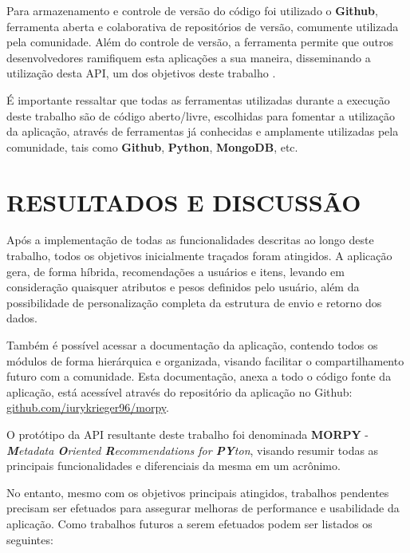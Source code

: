 \documentclass[12pt, openright, oneside, a4paper, brazil]{abntex2}
\begin{document}
Para armazenamento e controle de versão do código foi utilizado o \textbf{Github}, ferramenta aberta e colaborativa de repositórios de versão, comumente utilizada pela comunidade. Além do controle de versão, a ferramenta permite que outros desenvolvedores ramifiquem esta aplicações a sua maneira, disseminando a utilização desta API, um dos objetivos deste trabalho \cite{dabbish2012social}.

É importante ressaltar que todas as ferramentas utilizadas durante a execução deste trabalho são de código aberto/livre, escolhidas para fomentar a utilização da aplicação, através de ferramentas já conhecidas e amplamente utilizadas pela comunidade, tais como \textbf{Github}, \textbf{Python}, \textbf{MongoDB}, etc.

%
%

\chapter{RESULTADOS E DISCUSSÃO}

Após a implementação de todas as funcionalidades descritas ao longo deste trabalho, todos os objetivos inicialmente traçados foram atingidos. A aplicação gera, de forma híbrida, recomendações a usuários e itens, levando em consideração quaisquer atributos e pesos definidos pelo usuário, além da possibilidade de personalização completa da estrutura de envio e retorno dos dados.

Também é possível acessar a documentação da aplicação, contendo todos os módulos de forma hierárquica e organizada, visando facilitar o compartilhamento futuro com a comunidade. Esta documentação, anexa a todo o código fonte da aplicação, está acessível através do repositório da aplicação no Github: \url{github.com/iurykrieger96/morpy}.

O protótipo da API resultante deste trabalho foi denominada \textbf{MORPY} - \textit{\textbf{M}etadata \textbf{O}riented \textbf{R}ecommendations for \textbf{PY}ton}, visando resumir todas as principais funcionalidades e diferenciais da mesma em um acrônimo.

No entanto, mesmo com os objetivos principais atingidos, trabalhos pendentes precisam ser efetuados para assegurar melhoras de performance e usabilidade da aplicação. Como trabalhos futuros a serem efetuados podem ser listados os seguintes:
\end{document}
